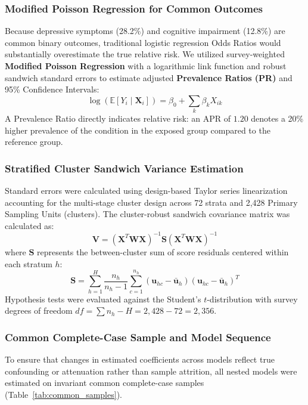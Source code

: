 \subsubsection{Modified Poisson Regression for Common Outcomes}
Because depressive symptoms (28.2\%) and cognitive impairment (12.8\%) are common binary outcomes, traditional logistic regression Odds Ratios would substantially overestimate the true relative risk. We utilized survey-weighted \textbf{Modified Poisson Regression} with a logarithmic link function and robust sandwich standard errors to estimate adjusted \textbf{Prevalence Ratios (PR)} and 95\% Confidence Intervals:
\begin{equation}
    \log \left( \mathbb{E}[Y_i \mid \mathbf{X}_i] \right) = \beta_0 + \sum_{k} \beta_k X_{ik}
\end{equation}
A Prevalence Ratio directly indicates relative risk: an APR of $1.20$ denotes a 20\% higher prevalence of the condition in the exposed group compared to the reference group.

\subsubsection{Stratified Cluster Sandwich Variance Estimation}
Standard errors were calculated using design-based Taylor series linearization accounting for the multi-stage cluster design across 72 strata and 2,428 Primary Sampling Units (clusters). The cluster-robust sandwich covariance matrix was calculated as:
\begin{equation}
    \mathbf{V} = \left( \mathbf{X}^T \mathbf{W} \mathbf{X} \right)^{-1} \mathbf{S} \left( \mathbf{X}^T \mathbf{W} \mathbf{X} \right)^{-1}
\end{equation}
where $\mathbf{S}$ represents the between-cluster sum of score residuals centered within each stratum $h$:
\begin{equation}
    \mathbf{S} = \sum_{h=1}^{H} \frac{n_h}{n_h - 1} \sum_{c=1}^{n_h} \left( \mathbf{u}_{hc} - \bar{\mathbf{u}}_h \right) \left( \mathbf{u}_{hc} - \bar{\mathbf{u}}_h \right)^T
\end{equation}
Hypothesis tests were evaluated against the Student's $t$-distribution with survey degrees of freedom $df = \sum n_h - H = 2,428 - 72 = 2,356$.

\subsubsection{Common Complete-Case Sample and Model Sequence}
To ensure that changes in estimated coefficients across models reflect true confounding or attenuation rather than sample attrition, all nested models were estimated on invariant common complete-case samples (Table~\ref{tab:common_samples}).

